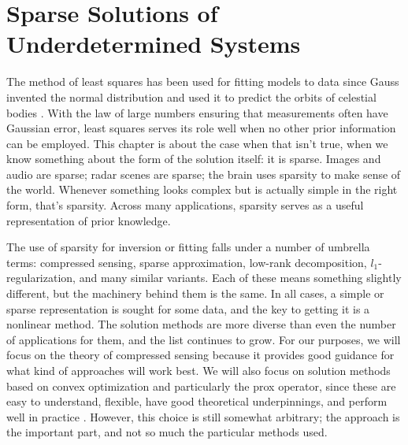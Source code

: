 \chapter{Sparse Solutions of Underdetermined Systems}
\label{sparsity_background}
The method of least squares has been used for fitting models to data since Gauss invented the normal distribution and used it to predict the orbits of celestial bodies \autocite{Sti81}. With the law of large numbers ensuring that measurements often have Gaussian error, least squares serves its role well when no other prior information can be employed. This chapter is about the case when that isn't true, when we know something about the form of the solution itself: it is sparse. Images and audio are sparse; radar scenes are sparse; the brain uses sparsity to make sense of the world. Whenever something looks complex but is actually simple in the right form, that's sparsity. Across many applications, sparsity serves as a useful representation of prior knowledge.

The use of sparsity for inversion or fitting falls under a number of umbrella terms: compressed sensing, sparse approximation, low-rank decomposition, $l_1$-regularization, and many similar variants. Each of these means something slightly different, but the machinery behind them is the same. In all cases, a simple or sparse representation is sought for some data, and the key to getting it is a nonlinear method. The solution methods are more diverse than even the number of applications for them, and the list continues to grow. For our purposes, we will focus on the theory of compressed sensing because it provides good guidance for what kind of approaches will work best. We will also focus on solution methods based on convex optimization and particularly the prox operator, since these are easy to understand, flexible, have good theoretical underpinnings, and perform well in practice \autocite{PB13}. However, this choice is still somewhat arbitrary; the approach is the important part, and not so much the particular methods used.

